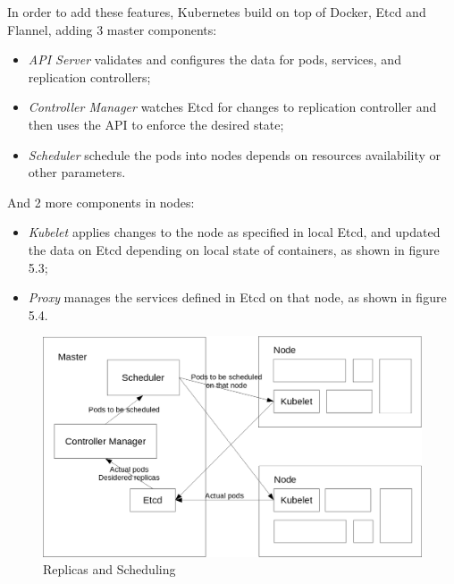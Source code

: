 In order to add these features, Kubernetes build on top of Docker, Etcd and Flannel, adding 3 master components:

\begin{itemize}
\item \textit{API Server} validates and configures the data for pods, services, and replication controllers;
\item \textit{Controller Manager} watches Etcd for changes to replication controller and then uses the API to enforce the desired state;
\item \textit{Scheduler} schedule the pods into nodes depends on resources availability or other parameters.
\end{itemize}

And 2 more components in nodes:

\begin{itemize}
\item \textit{Kubelet} applies changes to the node as specified in local Etcd, and updated the data on Etcd depending on local state of containers, as shown in figure 5.3;
\item \textit{Proxy} manages the services defined in Etcd on that node, as shown in figure 5.4.
\end{itemize}

\begin{figure}[htbp]
\centering
\includegraphics{media/ch5-scheduling.png}
\caption{Replicas and Scheduling}
\end{figure}

